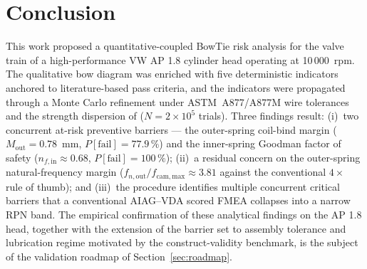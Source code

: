 
\section{Conclusion}\label{sec:conclusion}

This work proposed a quantitative-coupled BowTie risk analysis for
the valve train of a high-performance VW AP 1.8 cylinder head
operating at 10\,000~rpm. The qualitative bow diagram was enriched
with five deterministic indicators anchored to literature-based pass
criteria, and the indicators were propagated through a Monte Carlo
refinement under ASTM~A877/A877M wire tolerances and the
strength dispersion of \citet[\S~10-30]{shigley2020}
($N=2\times 10^{5}$ trials). Three findings result: (i)~two
concurrent at-risk preventive barriers --- the outer-spring
coil-bind margin ($M_{\mathrm{out}}=0.78$~mm, $P[\mathrm{fail}]=77.9\,\%$)
and the inner-spring Goodman factor of safety
($n_{f,\mathrm{in}}\approx 0.68$, $P[\mathrm{fail}]=100\,\%$); (ii)~a
residual concern on the outer-spring natural-frequency margin
($f_{n,\mathrm{out}}/f_{\mathrm{cam,max}}\approx 3.81$ against the
conventional $4\times$ rule of thumb); and (iii)~the procedure
identifies multiple concurrent critical barriers that a conventional
AIAG--VDA scored FMEA collapses into a narrow RPN band. The
empirical confirmation of these analytical findings on the AP 1.8
head, together with the extension of the barrier set to assembly
tolerance and lubrication regime motivated by the construct-validity
benchmark, is the subject of the validation roadmap of
Section~\ref{sec:roadmap}.
